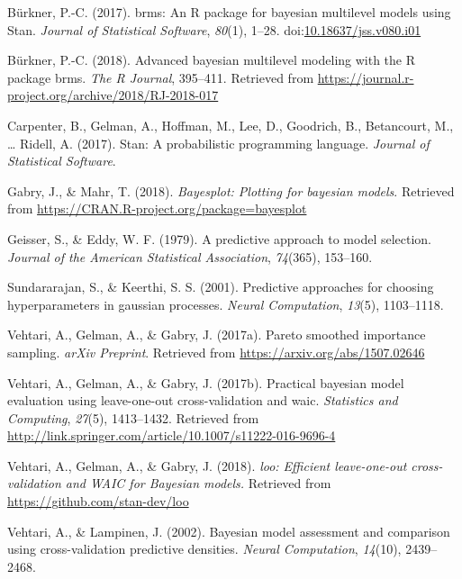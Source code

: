 \documentclass[english,,doc,floatsintext]{apa6}
\theoremstyle{definition}
\theoremstyle{definition}
\theoremstyle{definition}
\theoremstyle{remark}
\begin{document}
\leavevmode\hypertarget{ref-brms1}{}%
Bürkner, P.-C. (2017). brms: An R package for bayesian multilevel models
using Stan. \emph{Journal of Statistical Software}, \emph{80}(1), 1--28.
doi:\href{https://doi.org/10.18637/jss.v080.i01}{10.18637/jss.v080.i01}

\leavevmode\hypertarget{ref-brms2}{}%
Bürkner, P.-C. (2018). Advanced bayesian multilevel modeling with the R
package brms. \emph{The R Journal}, 395--411. Retrieved from
\url{https://journal.r-project.org/archive/2018/RJ-2018-017}

\leavevmode\hypertarget{ref-carpenter2017}{}%
Carpenter, B., Gelman, A., Hoffman, M., Lee, D., Goodrich, B.,
Betancourt, M., \ldots{} Ridell, A. (2017). Stan: A probabilistic
programming language. \emph{Journal of Statistical Software}.

\leavevmode\hypertarget{ref-bayesplot}{}%
Gabry, J., \& Mahr, T. (2018). \emph{Bayesplot: Plotting for bayesian
models}. Retrieved from
\url{https://CRAN.R-project.org/package=bayesplot}

\leavevmode\hypertarget{ref-geisser1979}{}%
Geisser, S., \& Eddy, W. F. (1979). A predictive approach to model
selection. \emph{Journal of the American Statistical Association},
\emph{74}(365), 153--160.

\leavevmode\hypertarget{ref-sundararajan2001}{}%
Sundararajan, S., \& Keerthi, S. S. (2001). Predictive approaches for
choosing hyperparameters in gaussian processes. \emph{Neural
Computation}, \emph{13}(5), 1103--1118.

\leavevmode\hypertarget{ref-vehtari2017psis}{}%
Vehtari, A., Gelman, A., \& Gabry, J. (2017a). Pareto smoothed
importance sampling. \emph{arXiv Preprint}. Retrieved from
\url{https://arxiv.org/abs/1507.02646}

\leavevmode\hypertarget{ref-vehtari2017loo}{}%
Vehtari, A., Gelman, A., \& Gabry, J. (2017b). Practical bayesian model
evaluation using leave-one-out cross-validation and waic.
\emph{Statistics and Computing}, \emph{27}(5), 1413--1432. Retrieved
from \url{http://link.springer.com/article/10.1007/s11222-016-9696-4}

\leavevmode\hypertarget{ref-loo2018}{}%
Vehtari, A., Gelman, A., \& Gabry, J. (2018). \emph{loo: Efficient
leave-one-out cross-validation and WAIC for Bayesian models.} Retrieved
from \url{https://github.com/stan-dev/loo}

\leavevmode\hypertarget{ref-vehtari2002}{}%
Vehtari, A., \& Lampinen, J. (2002). Bayesian model assessment and
comparison using cross-validation predictive densities. \emph{Neural
Computation}, \emph{14}(10), 2439--2468.
\end{document}
